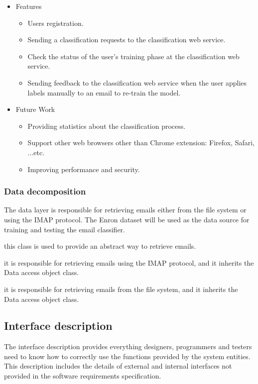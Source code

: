 \begin{itemize}
 \item Features
 \begin{itemize}
    \item Users registration.
    \item Sending a classification requests to the classification web service.
    \item Check the status of the user's training phase at the classification 
    web service.
    \item Sending feedback to the classification web service when the user
    applies labels manually to an email to re-train the model.
 \end{itemize}
 \item Future Work
  \begin{itemize}
    \item Providing statistics about the classification process.
    \item Support other web browsers other than Chrome extension: Firefox, 
    Safari, ...etc.
    \item Improving performance and security.
  \end{itemize}
\end{itemize}

\subsubsection{Data decomposition}
The data layer is responsible for retrieving emails either from the file system or using 
the IMAP protocol. The Enron dataset \cite{ENRON} will be used as the data source for training and 
testing the email classifier.

\begin{my_desc}
  \item[Data access object] this class is used to provide an abstract way to retrieve emails.
  \item[IMAP Data access object] it is responsible for retrieving emails using the IMAP protocol,
  and it inherits the Data access object class.
  \item[File system data access object] it is responsible for retrieving emails from the file
  system, and it inherits the Data access object class.
\end{my_desc}


\subsection{Interface description}
The interface description provides everything designers, programmers and 
testers need to know how to correctly use the functions provided by the system 
entities. This description includes the details of external and internal 
interfaces not provided in the software requirements specification.

